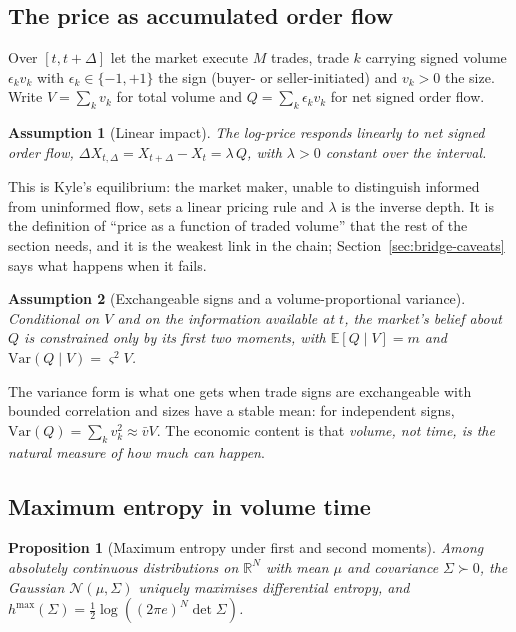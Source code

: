 \documentclass[11pt]{article}
\newtheorem{proposition}{Proposition}
\newtheorem{assumption}{Assumption}
\theoremstyle{definition}
\theoremstyle{remark}
\begin{document}
\subsection{The price as accumulated order flow}

Over $[t,t+\Delta]$ let the market execute $M$ trades, trade $k$ carrying signed
volume $\epsilon_k v_k$ with $\epsilon_k\in\{-1,+1\}$ the sign (buyer- or
seller-initiated) and $v_k>0$ the size. Write $V=\sum_k v_k$ for total volume
and $Q=\sum_k \epsilon_k v_k$ for net signed order flow.

\begin{assumption}[Linear impact]\label{as:impact}
The log-price responds linearly to net signed order flow,
$\Delta X_{t,\Delta} = X_{t+\Delta}-X_t = \lambda\,Q$, with $\lambda>0$ constant
over the interval.
\end{assumption}

This is Kyle's \citeyearpar{kyle1985} equilibrium: the market maker, unable to
distinguish informed from uninformed flow, sets a linear pricing rule and
$\lambda$ is the inverse depth. It is the definition of ``price as a function of
traded volume'' that the rest of the section needs, and it is the weakest link
in the chain; Section~\ref{sec:bridge-caveats} says what happens when it fails.

\begin{assumption}[Exchangeable signs and a volume-proportional variance]
\label{as:signs}
Conditional on $V$ and on the information available at $t$, the market's belief
about $Q$ is constrained only by its first two moments, with
$\mathbb{E}[Q\mid V] = m$ and $\mathrm{Var}(Q\mid V) = \varsigma^2 V$.
\end{assumption}

The variance form is what one gets when trade signs are exchangeable with
bounded correlation and sizes have a stable mean: for independent signs,
$\mathrm{Var}(Q)=\sum_k v_k^2 \approx \bar v V$. The economic content is that
\emph{volume, not time, is the natural measure of how much can happen}.

\subsection{Maximum entropy in volume time}

\begin{proposition}[Maximum entropy under first and second moments]
\label{prop:maxent}
Among absolutely continuous distributions on $\mathbb{R}^N$ with mean $\mu$ and
covariance $\Sigma\succ0$, the Gaussian $\mathcal N(\mu,\Sigma)$ uniquely
maximises differential entropy, and
$h^{\max}(\Sigma)=\tfrac12\log\left((2\pi e)^N\det\Sigma\right)$.
\end{proposition}
\end{document}
